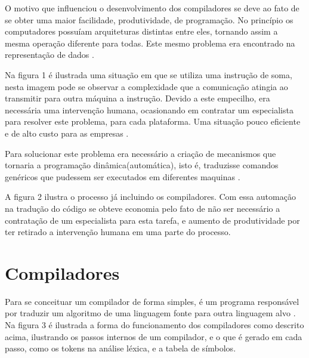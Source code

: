 \documentclass[12pt,oneside,a4paper,chapter=TITLE,section=TITLE,sumario=tradicional]{abntex2}
\begin{document}
O motivo que influenciou o desenvolvimento dos compiladores se deve ao fato de se obter uma maior facilidade, produtividade, de programação. No princípio os computadores possuíam arquiteturas distintas entre eles, tornando assim a mesma operação diferente para todas. Este mesmo problema era encontrado na representação de dados \cite{ricarte2008}.

Na figura 1 é ilustrada uma situação em que se utiliza uma instrução de soma, nesta imagem pode se observar a complexidade que a comunicação atingia ao transmitir para outra máquina a instrução. Devido a este empecilho, era necessária uma intervenção humana, ocasionando em contratar um especialista para resolver este problema, para cada plataforma. Uma situação pouco eficiente e de alto custo para as empresas  \cite{ricarte2008}.

\begin{figure}[htb]
\end{figure}
Para solucionar este problema era necessário a criação de mecanismos que tornaria a programação dinâmica(automática), isto é, traduzisse comandos genéricos que pudessem ser executados em diferentes maquinas \cite{ricarte2008}.

A figura 2 ilustra o processo já incluindo os compiladores. Com essa automação na tradução do código se obteve economia pelo fato de não ser necessário a contratação de um especialista para esta tarefa, e aumento de produtividade por ter retirado a intervenção humana em uma parte do processo. 

\begin{figure}[htb]
\end{figure}

\section{Compiladores}
\label{sec:compiladores}

Para se conceituar um compilador de forma simples, é um programa responsável por traduzir um algoritmo de uma linguagem fonte para outra linguagem alvo \cite{alfred1995}. Na figura 3 é ilustrada a forma do funcionamento dos compiladores como descrito acima, ilustrando os passos internos de um compilador, e o que é gerado em cada passo, como os tokens na análise léxica, e a tabela de símbolos.
\end{document}
